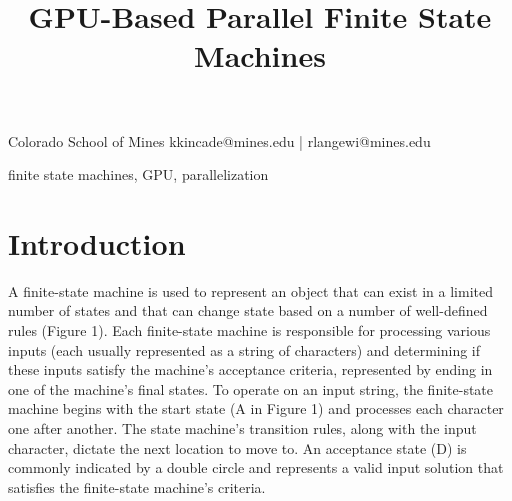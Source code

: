 \documentclass[11pt]{sigplanconf}
\begin{document}
\setlength{\pdfpageheight}{\paperheight}
\setlength{\pdfpagewidth}{\paperwidth}






\title{GPU-Based Parallel Finite State Machines}

           {Colorado School of Mines}
           {kkincade@mines.edu | rlangewi@mines.edu}

\maketitle


\terms
finite state machines, GPU, parallelization

\section{Introduction}
 
A finite-state machine is used to represent an object that can exist in a limited number of states and that can change state based on a number of well-defined rules (Figure 1). Each finite-state machine is responsible for processing various inputs (each usually represented as a string of characters) and determining if these inputs satisfy the machine's acceptance criteria, represented by ending in one of the machine's final states. To operate on an input string, the finite-state machine begins with the start state (A in Figure 1) and processes each character one after another. The state machine's transition rules, along with the input character, dictate the next location to move to. An acceptance state (D) is commonly indicated by a double circle and represents a valid input solution that satisfies the finite-state machine's criteria.
\end{document}
